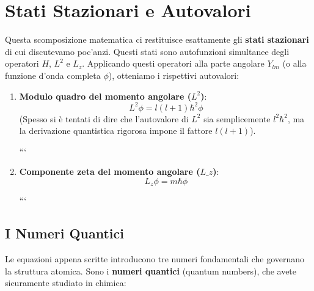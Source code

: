 \section{Stati Stazionari e Autovalori}

Questa scomposizione matematica ci restituisce esattamente gli \textbf{stati stazionari} di cui discutevamo poc'anzi. Questi stati sono autofunzioni simultanee degli operatori $H$, $L^2$ e $L_z$.
Applicando questi operatori alla parte angolare $Y_{lm}$ (o alla funzione d'onda completa $\phi$), otteniamo i rispettivi autovalori:

\begin{enumerate}
\item \textbf{Modulo quadro del momento angolare ($L^2$)}:
\begin{equation}
L^2 \phi = l(l+1)\hbar^2 \phi
\end{equation}
(Spesso si è tentati di dire che l'autovalore di $L^2$ sia semplicemente $l^2 \hbar^2$, ma la derivazione quantistica rigorosa impone il fattore $l(l+1)$).

```
\item \textbf{Componente zeta del momento angolare ($L\_z$)}:
\begin{equation}
    L_z \phi = m \hbar \phi
\end{equation}

```

\end{enumerate}

\subsection{I Numeri Quantici}

Le equazioni appena scritte introducono tre numeri fondamentali che governano la struttura atomica. Sono i \textbf{numeri quantici} (quantum numbers), che avete sicuramente studiato in chimica:

